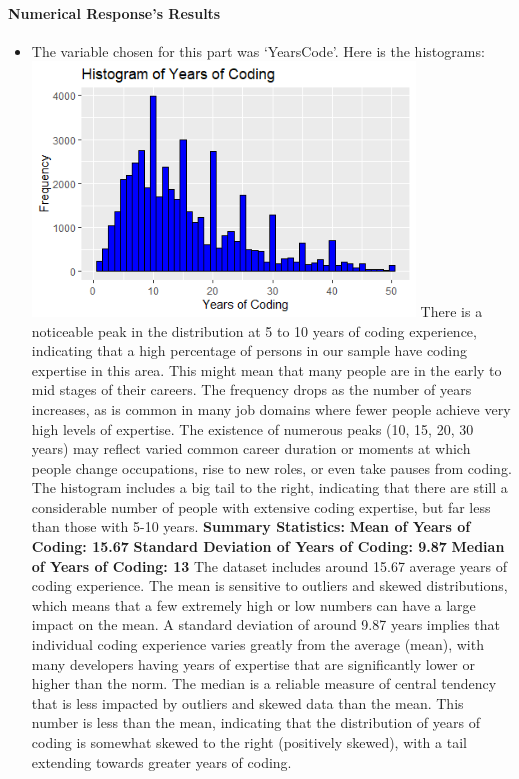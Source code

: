\documentclass[
  12pt,
]{article}
\providecommand{\tightlist}{%
  \setlength{\itemsep}{0pt}\setlength{\parskip}{0pt}}
\begin{document}
\hypertarget{numerical-responses-results}{%
\paragraph{Numerical Response's
Results}\label{numerical-responses-results}}

\begin{itemize}
\tightlist
\item
  The variable chosen for this part was `YearsCode'. Here is the
  histograms:
  \includegraphics[width=0.8\textwidth,height=0.8\textheight]{yearsCode_numeric_histogram.png}
  There is a noticeable peak in the distribution at 5 to 10 years of
  coding experience, indicating that a high percentage of persons in our
  sample have coding expertise in this area. This might mean that many
  people are in the early to mid stages of their careers. The frequency
  drops as the number of years increases, as is common in many job
  domains where fewer people achieve very high levels of expertise. The
  existence of numerous peaks (10, 15, 20, 30 years) may reflect varied
  common career duration or moments at which people change occupations,
  rise to new roles, or even take pauses from coding. The histogram
  includes a big tail to the right, indicating that there are still a
  considerable number of people with extensive coding expertise, but far
  less than those with 5-10 years. \textbf{Summary Statistics:}
  \textbf{Mean of Years of Coding: 15.67} \textbf{Standard Deviation of
  Years of Coding: 9.87} \textbf{Median of Years of Coding: 13} The
  dataset includes around 15.67 average years of coding experience. The
  mean is sensitive to outliers and skewed distributions, which means
  that a few extremely high or low numbers can have a large impact on
  the mean. A standard deviation of around 9.87 years implies that
  individual coding experience varies greatly from the average (mean),
  with many developers having years of expertise that are significantly
  lower or higher than the norm. The median is a reliable measure of
  central tendency that is less impacted by outliers and skewed data
  than the mean. This number is less than the mean, indicating that the
  distribution of years of coding is somewhat skewed to the right
  (positively skewed), with a tail extending towards greater years of
  coding.
\end{itemize}
\end{document}
